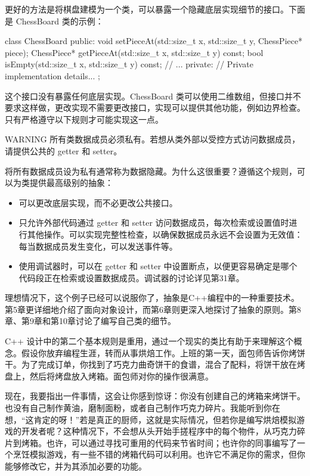 更好的方法是将棋盘建模为一个类，可以暴露一个隐藏底层实现细节的接口。下面是 ChessBoard 类的示例：

\begin{cpp}
class ChessBoard
{
    public:
        void setPieceAt(std::size_t x, std::size_t y, ChessPiece* piece);
        ChessPiece* getPieceAt(std::size_t x, std::size_t y) const;
        bool isEmpty(std::size_t x, std::size_t y) const;
        // ...
    private:
        // Private implementation details...
};
\end{cpp}

这个接口没有暴露任何底层实现。ChessBoard 类可以使用二维数组，但接口并不要求这样做，更改实现不需要更改接口，实现可以提供其他功能，例如边界检查。只有严格遵守以下规则才可能实现这一点。

\begin{myWarning}{WARNING}
所有类数据成员必须私有。若想从类外部以受控方式访问数据成员，请提供公共的 getter 和 setter。
\end{myWarning}

将所有数据成员设为私有通常称为数据隐藏。为什么这很重要？遵循这个规则，可以为类提供最高级别的抽象：

\begin{itemize}
\item
可以更改底层实现，而不必更改公共接口。

\item
只允许外部代码通过 getter 和 setter 访问数据成员，每次检索或设置值时进行其他操作。可以实现完整性检查，以确保数据成员永远不会设置为无效值：每当数据成员发生变化，可以发送事件等。

\item
使用调试器时，可以在 getter 和 setter 中设置断点，以便更容易确定是哪个代码段正在检索或设置数据成员。调试器的讨论详见第31章。
\end{itemize}

理想情况下，这个例子已经可以说服你了，抽象是C++编程中的一种重要技术。第5章更详细地介绍了面向对象设计，而第6章则更深入地探讨了抽象的原则。第8章、第9章和第10章讨论了编写自己类的细节。


C++ 设计中的第二个基本规则是重用，通过一个现实的类比有助于来理解这个概念。假设你放弃编程生涯，转而从事烘焙工作。上班的第一天，面包师告诉你烤饼干。为了完成订单，你找到了巧克力曲奇饼干的食谱，混合了配料，将饼干放在烤盘上，然后将烤盘放入烤箱。面包师对你的操作很满意。

现在，我要指出一件事情，这会让你感到惊讶：你没有创建自己的烤箱来烤饼干。也没有自己制作黄油，磨制面粉，或者自己制作巧克力碎片。我能听到你在想，“这肯定的呀！”若是真正的厨师，这就是实际情况，但若你是编写烘焙模拟游戏的开发者呢？这种情况下，不会想从头开始手搓程序中的每个物件，从巧克力碎片到烤箱。也许，可以通过寻找可重用的代码来节省时间；也许你的同事编写了一个烹饪模拟游戏，有一些不错的烤箱代码可以利用。也许它不满足你的需求，但你能够修改它，并为其添加必要的功能。

